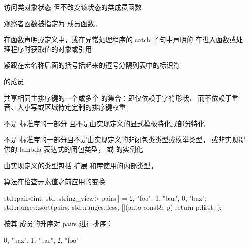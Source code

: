 %
访问类对象状态
但不改变该状态的类成员函数

\begin{defnote}
观察者函数被指定为
成员函数。
\end{defnote}

%
%
%
 在函数声明或定义中，或在异常处理程序的 catch 子句中声明的
在进入函数或处理程序时获取值的对象或引用

%
%
 紧跟在宏名称后面的括号括起来的逗号分隔列表中的标识符

%
%
  的成员

%
共享相同主排序键的一个或多个  的集合：即仅依赖于字符形状，
而不依赖于重音、大小写或区域特定定制的排序键权重

%
不是 \Cpp{} 标准库的一部分
且不是由实现定义的显式模板特化或部分特化

%
不是 \Cpp{} 标准库的一部分且不是由实现定义的非闭包类类型或枚举类型，
或非实现提供的 lambda 表达式的闭包类型，
或  的实例化

\begin{defnote}
由实现定义的类型包括
扩展 和库使用的内部类型。
\end{defnote}

%
算法在检查元素值之前应用的变换

\begin{example}
\begin{codeblock}
std::pair<int, std::string_view> pairs[] = {{2, "foo"}, {1, "bar"}, {0, "baz"}};
std::ranges::sort(pairs, std::ranges::less{}, [](auto const& p) { return p.first; });
\end{codeblock}
按其  成员的升序对 pairs 进行排序：
\begin{codeblock}
{{0, "baz"}, {1, "bar"}, {2, "foo"}}
\end{codeblock}
\end{example}

